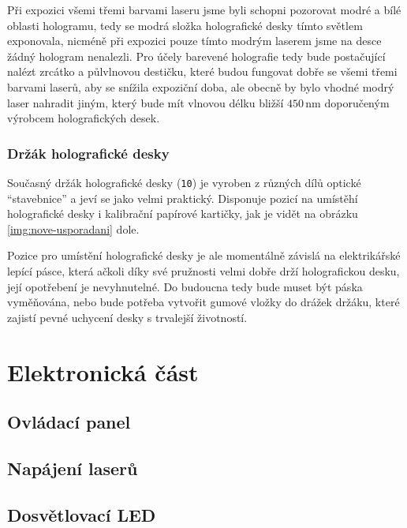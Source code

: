 \documentclass[twoside,project]{../MFFPrace}
\begin{document}
Při expozici všemi třemi barvami laseru jsme byli schopni pozorovat modré a bílé oblasti hologramu, tedy se modrá složka holografické desky tímto světlem exponovala, nicméně při expozici pouze tímto modrým laserem jsme na desce žádný hologram nenalezli. Pro účely barevené holografie tedy bude postačující nalézt zrcátko a půlvlnovou destičku, které budou fungovat dobře se všemi třemi barvami laserů, aby se snížila expoziční doba, ale obecně by bylo vhodné modrý laser nahradit jiným, který bude mít vlnovou délku bližší $450\,\text{nm}$ doporučeným výrobcem holografických desek.

\subsection*{Držák holografické desky}
Současný držák holografické desky (\texttt{10}) je vyroben z různých dílů optické "`stavebnice"' a jeví se jako velmi praktický. Disponuje pozicí na umístěhí holografické desky i kalibrační papírové kartičky, jak je vidět na obrázku \ref{img:nove-usporadani} dole.

Pozice pro umístění holografické desky je ale momentálně závislá na elektrikářské lepící pásce, která ačkoli díky své pružnosti velmi dobře drží holografickou desku, její opotřebení je nevyhnutelné. Do budoucna tedy bude muset být páska vyměňována, nebo bude potřeba vytvořit gumové vložky do drážek držáku, které zajistí pevné uchycení desky s trvalejší životností. 

\chapter{Elektronická část}
\begin{center}
\end{center}
\section{Ovládací panel}

\section{Napájení laserů}

\section{Dosvětlovací LED}
\end{document}
